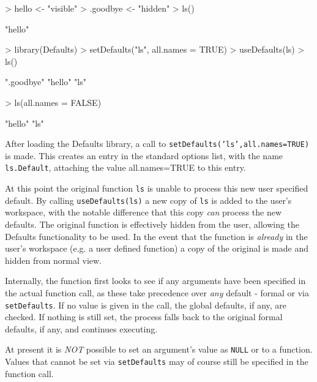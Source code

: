 \documentclass{article}
\begin{document}
\begin{Schunk}
\begin{Sinput}
> hello <- "visible"
> .goodbye <- "hidden"
> ls()
\end{Sinput}
\begin{Soutput}
[1] "hello"
\end{Soutput}
\begin{Sinput}
> library(Defaults)
> setDefaults("ls", all.names = TRUE)
> useDefaults(ls)
> ls()
\end{Sinput}
\begin{Soutput}
[1] ".goodbye" "hello"    "ls"      
\end{Soutput}
\begin{Sinput}
> ls(all.names = FALSE)
\end{Sinput}
\begin{Soutput}
[1] "hello" "ls"   
\end{Soutput}
\end{Schunk}

\noindent
After loading the {\sf Defaults} library, a call to
{\tt setDefaults('ls',all.names=TRUE)} is made. This
creates an entry in the standard {\sf options} list, with
the name {\tt ls.Default}, attaching the value all.names=TRUE
to this entry.

\vspace{5mm}
\noindent
At this point the original function {\tt ls} is unable to
process this new user specified default. By calling
{\tt useDefaults(ls)} a new copy of {\tt ls} is added
to the user's workspace, with the notable difference that this
copy {\em can} process the new defaults. The original function is
effectively hidden from the user, allowing the {\sf Defaults}
functionality to be used. In the event that the function is
{\em already} in the user's workspace (e.g. a user defined function)
a copy of the original is made and hidden from normal view.

\vspace{5mm}
\noindent
Internally, the function first looks to see if
any arguments have been specified in the actual
function call, as these take precedence over {\em any}
default - formal or via {\tt setDefaults}. If no
value is given in the call, the global defaults, if any,
are checked.  If nothing is still set, the process falls
back to the original formal defaults, if any, and continues
executing.

\vspace{5mm}
\noindent
At present it is {\em NOT} possible to set an
argument's value as {\tt NULL} or to a function.
Values that cannot be set via {\tt setDefaults} may
of course still be specified in the function call.
\end{document}
